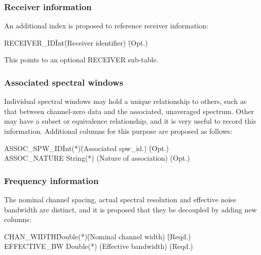 \documentclass{article}
\begin{document}
\begin{itemize}
\subsubsection{Receiver information}

An additional index is proposed to reference receiver information:

\begin{tabbing}
RECEIVER\_ID\quad\quad \= Int\quad\quad \= 
(Receiver identifier) \quad\quad\quad\quad\quad \= (Opt.) \\
\end{tabbing}

This points to an optional RECEIVER sub-table.

\subsubsection{Associated spectral windows}

Individual spectral windows may hold a unique relationship to others,
such as that between channel-zero data and the associated, unaveraged
spectrum. Other may have a subset or equivalence relationship, and it
is very useful to record this information. Additional columns for this
purpose are proposed as follows:

\begin{tabbing}
ASSOC\_SPW\_ID\quad\quad \= Int(*)\quad\quad \= 
(Associated spw\_id.) \quad\quad\quad\quad\quad \= (Opt.) \\
ASSOC\_NATURE           \> String(*)  \> 
(Nature of association) \> (Opt.) \\
\end{tabbing}

\subsubsection{Frequency information}

The nominal channel spacing, actual spectral resolution and effective
noise bandwidth are distinct, and it is proposed that they be
decoupled by adding new columns:

\begin{tabbing}
CHAN\_WIDTH\quad\quad \= Double(*)\quad\quad \= 
(Nominal channel width) \quad\quad\quad\quad\quad \= (Reqd.) \\
EFFECTIVE\_BW \> Double(*) \> (Effective bandwidth) \> (Reqd.)\\
\end{tabbing}


\end{itemize}
\end{document}
